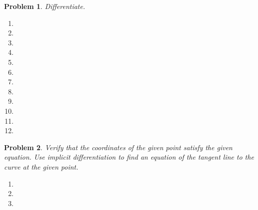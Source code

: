 \documentclass{article}
\renewcommand{\fcProblemRef}{\theproblem.\theenumi}
\newtheorem{problem}{Problem}
\begin{document}
\begin{problem}Differentiate.
\begin{multicols}{2}
\begin{enumerate}[ref={\fcProblemRef}]
\item 
\item 
\item 
\item 
\item 
\item 
\item 

\item 

\item 

\item 

\item 

\item 

\end{enumerate}
\end{multicols}
\end{problem} 


\begin{problem}Verify that the coordinates of the given point satisfy the given equation. Use implicit differentiation to find an equation of the tangent line to the curve at the given point.

\begin{enumerate}[ref={\fcProblemRef}]
\item 
\item 
\item


\end{enumerate}
\end{problem}
\end{document}
